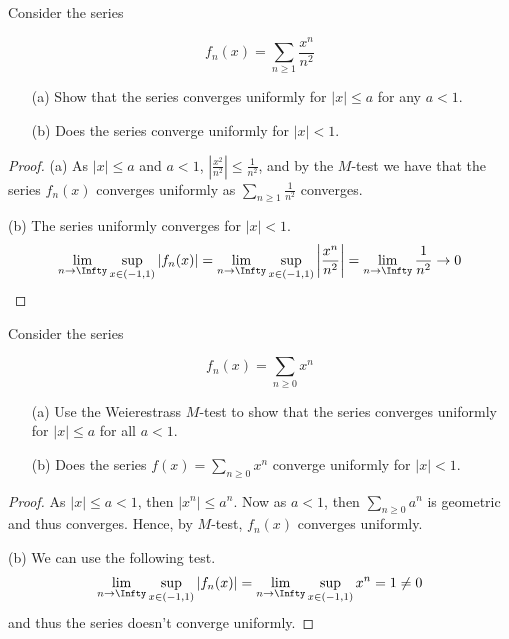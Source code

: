 \documentclass[oneside]{amsart}
\theoremstyle{definition}
\begin{document}
\begin{tcolorbox}[colback=black!5!white,colframe=black!75!black,title= Exercise $4.4.$]Consider the series 

$$ f_n (x) = \sum_{n \geq 1 } \frac{x^n}{n^2}$$

\begin{itemize}
	\item [(a)] Show that the series converges uniformly for $|x| \leq a$ for any $a<1$.
	\item [(b)] Does the series converge uniformly for $|x|<1$.
\end{itemize}
\tcblower 
\begin{proof} 

(a) As $|x| \leq a$ and $a<1$, $\left | \frac{x^2}{n^2}\right| \leq \frac{1}{n^2}$, and by the $M$-test we have that the series $f_n(x)$ converges uniformly as $\sum_{n \geq 1} \frac{1}{n^2}$ converges.

(b) The series uniformly converges for $|x|<1$.
\begin{align*}
	\lim_{n\to \Infty} \sup _{x \in (-1,1)} |f_n(x)|= \lim_{n\to \Infty} \sup _{x \in (-1,1)} \left | \frac{x^n}{n^2}  \right | = \lim_{n\to \Infty} \frac{1}{n^2} \to 0 
\end{align*}

\end{proof}
\end{tcolorbox}

\begin{tcolorbox}[colback=black!5!white,colframe=black!75!black,title= Exercise $4.5.$]Consider the series 

$$ f_n (x) = \sum_{ n \geq 0 }x^n$$

\begin{itemize}
	\item [(a)] Use the Weierestrass $M$-test to show that the series converges uniformly for $|x| \leq a$ for all $a < 1$.
	\item [(b)] Does the series $f(x) = \sum _{n \geq 0} x^n$ converge uniformly for $|x|<1$.
\end{itemize}
\tcblower 
\begin{proof} 
As $|x| \leq a<1$, then $|x^n|\leq a^n$. Now as $a <1$, then $\sum_{n\geq 0} a^n$ is geometric and thus converges. Hence, by $M$-test, $f_n(x)$ converges uniformly.

(b) We can use the following test.  \begin{align*}
	\lim_{n\to \Infty} \sup _{x \in (-1,1)} |f_n(x)|= \lim_{n\to \Infty} \sup _{x \in (-1,1)} x^n =1\neq 0
\end{align*} and thus the series doesn't converge uniformly. 
\end{proof}
\end{tcolorbox}
\end{document}
